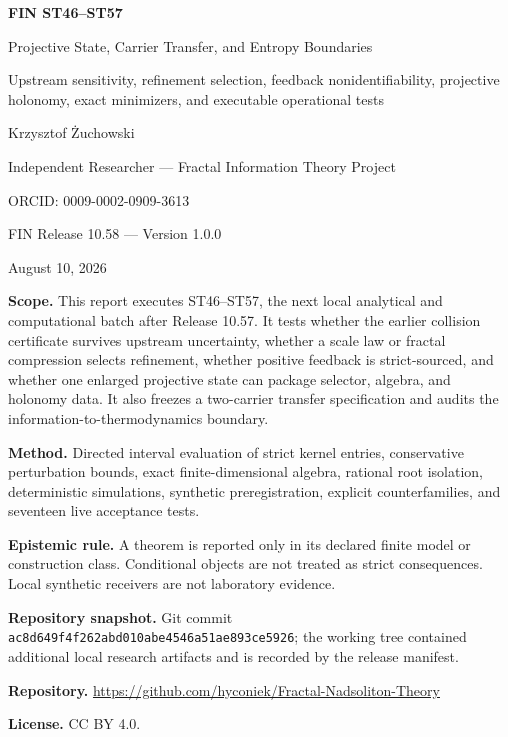 \documentclass[11pt,a4paper]{article}
\begin{document}
\begin{titlepage}
\centering
\vspace*{1.25cm}
{\LARGE\bfseries FIN ST46--ST57\par}
\vspace{0.35cm}
{\Large Projective State, Carrier Transfer, and Entropy Boundaries\par}
\vspace{0.40cm}
{\large Upstream sensitivity, refinement selection, feedback nonidentifiability, projective holonomy, exact minimizers, and executable operational tests\par}
\vspace{1.05cm}
{\Large Krzysztof Żuchowski\par}
\vspace{0.24cm}
{\large Independent Researcher --- Fractal Information Theory Project\par}
{\large ORCID: 0009-0002-0909-3613\par}
\vspace{0.85cm}
{\large FIN Release 10.58 --- Version 1.0.0\par}
{\large August 10, 2026\par}
\vfill
\begin{minipage}{0.89\textwidth}
\textbf{Scope.} This report executes ST46--ST57, the next local analytical and computational batch after Release 10.57. It tests whether the earlier collision certificate survives upstream uncertainty, whether a scale law or fractal compression selects refinement, whether positive feedback is strict-sourced, and whether one enlarged projective state can package selector, algebra, and holonomy data. It also freezes a two-carrier transfer specification and audits the information-to-thermodynamics boundary.\par
\textbf{Method.} Directed interval evaluation of strict kernel entries, conservative perturbation bounds, exact finite-dimensional algebra, rational root isolation, deterministic simulations, synthetic preregistration, explicit counterfamilies, and seventeen live acceptance tests.\par
\textbf{Epistemic rule.} A theorem is reported only in its declared finite model or construction class. Conditional objects are not treated as strict consequences. Local synthetic receivers are not laboratory evidence.\par
\textbf{Repository snapshot.} Git commit \texttt{ac8d649f4f262abd010abe4546a51ae893ce5926}; the working tree contained additional local research artifacts and is recorded by the release manifest.\par
\textbf{Repository.} \url{https://github.com/hyconiek/Fractal-Nadsoliton-Theory}\par
\textbf{License.} CC BY 4.0.
\end{minipage}
\end{titlepage}
\end{document}
